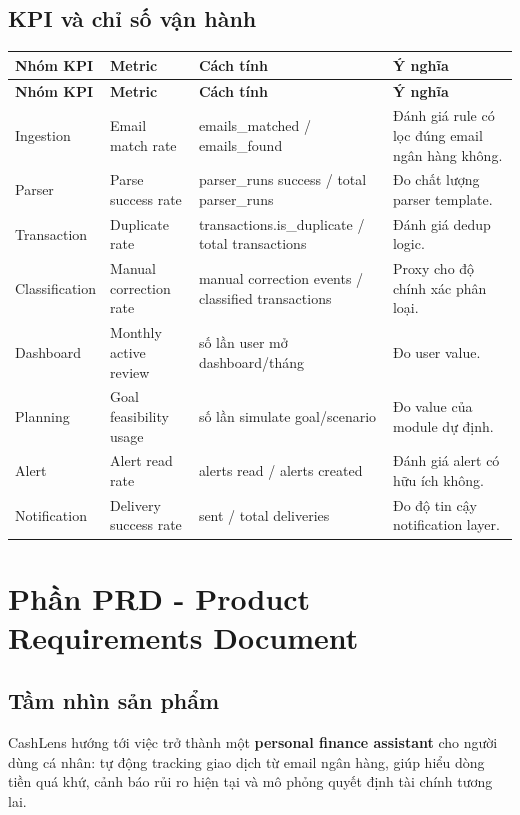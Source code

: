 \documentclass[11pt,a4paper]{article}
\renewcommand{\thead}[1]{\textbf{\color{PrimaryDark}#1}}
\newenvironment{tableblock}{\Needspace{8\baselineskip}\vspace{0.25em}}{\vspace{0.75em}}
\begin{document}
\subsection{KPI và chỉ số vận hành}
\begin{tableblock}
\scriptsize
\begin{longtable}{L{2.9cm}L{4.0cm}L{4.2cm}L{4.4cm}}
\thead{Nhóm KPI} & \thead{Metric} & \thead{Cách tính} & \thead{Ý nghĩa} \\
\endfirsthead
{}\thead{Nhóm KPI} & \thead{Metric} & \thead{Cách tính} & \thead{Ý nghĩa} \\
\endhead
Ingestion & Email match rate & emails\_matched / emails\_found & Đánh giá rule có lọc đúng email ngân hàng không. \\
Parser & Parse success rate & parser\_runs success / total parser\_runs & Đo chất lượng parser template. \\
Transaction & Duplicate rate & transactions.is\_duplicate / total transactions & Đánh giá dedup logic. \\
Classification & Manual correction rate & manual correction events / classified transactions & Proxy cho độ chính xác phân loại. \\
Dashboard & Monthly active review & số lần user mở dashboard/tháng & Đo user value. \\
Planning & Goal feasibility usage & số lần simulate goal/scenario & Đo value của module dự định. \\
Alert & Alert read rate & alerts read / alerts created & Đánh giá alert có hữu ích không. \\
Notification & Delivery success rate & sent / total deliveries & Đo độ tin cậy notification layer. \\
\end{longtable}
\end{tableblock}

\section{Phần PRD - Product Requirements Document}

\subsection{Tầm nhìn sản phẩm}
CashLens hướng tới việc trở thành một \textbf{personal finance assistant} cho người dùng cá nhân: tự động tracking giao dịch từ email ngân hàng, giúp hiểu dòng tiền quá khứ, cảnh báo rủi ro hiện tại và mô phỏng quyết định tài chính tương lai.
\end{document}
